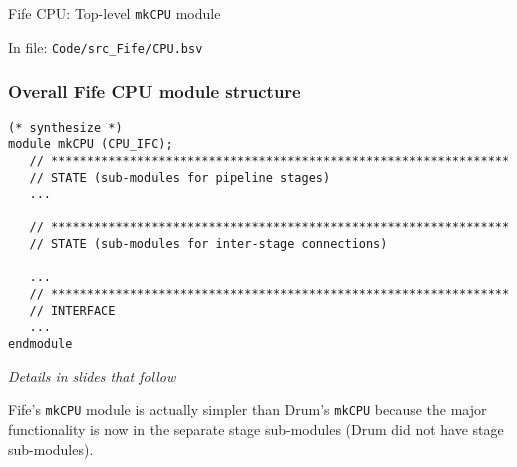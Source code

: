 \begin{frame}[fragile]

\begin{center}
  {\LARGE Fife CPU: Top-level {\tt mkCPU} module}

  \vspace{10ex}

  In file: {\tt Code/src\_Fife/CPU.bsv}
\end{center}

\end{frame}


\begin{frame}[fragile]
\frametitle{Overall Fife CPU module structure}

\footnotesize

\begin{minipage}{0.725\textwidth}
\begin{Verbatim}[frame=single, label=From src\_Drum/CPU.bsv]
(* synthesize *)
module mkCPU (CPU_IFC);
   // ****************************************************************
   // STATE (sub-modules for pipeline stages)
   ...

   // ****************************************************************
   // STATE (sub-modules for inter-stage connections)

   ...
   // ****************************************************************
   // INTERFACE
   ...
endmodule
\end{Verbatim}
\end{minipage}
\hm
\emph{Details in slides that follow}

\vspace{5ex}

Fife's {\tt mkCPU} module is actually simpler than Drum's {\tt mkCPU}
because the major functionality is now in the separate stage
sub-modules (Drum did not have stage sub-modules).

\end{frame}


